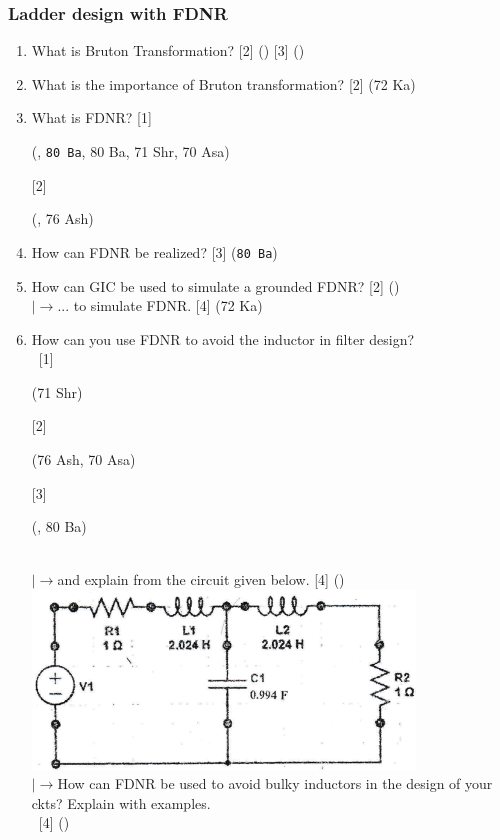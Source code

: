 \documentclass[12pt]{article}
\newcommand{\lb}{\\$\left|\rightarrow\right.$}
\newcommand{\enter}{\\\textcolor{white}{1}}
\begin{document}
		\subsubsection{Ladder design with FDNR}
			\begin{enumerate}
				\item What is Bruton Transformation? \hfill [2] () [3] ()

				\item What is the importance of Bruton transformation? \hfill [2] (72 Ka)		
			
				\item What is FDNR? \hfill [1] \begin{footnotesize} (, \texttt{80 Ba}, 80 Ba, 71 Shr, 70 Asa) \end{footnotesize} [2] \begin{footnotesize} (, 76 Ash) \end{footnotesize} 

				\item How can FDNR be realized? \hfill [3] (\texttt{80 Ba})

				\item How can GIC be used to simulate a grounded FDNR? \hfill [2] ()
				\lb ... to simulate FDNR. \hfill [4] (72 Ka)
				
				\item How can you use FDNR to avoid the inductor in filter design? 
				\enter\hfill [1] \begin{footnotesize} (71 Shr) \end{footnotesize} [2] \begin{footnotesize} (76 Ash, 70 Asa) \end{footnotesize} [3] \begin{footnotesize} (, 80 Ba) \end{footnotesize}
				\lb and explain from the circuit given below. \hfill [4] ()\\
				\includegraphics[width=4in]{./pics/fd_20}
				\lb How can FDNR be used to avoid bulky inductors in the design of your ckts? Explain with examples.
				\enter\hfill [4] ()


\end{enumerate}
\end{document}
